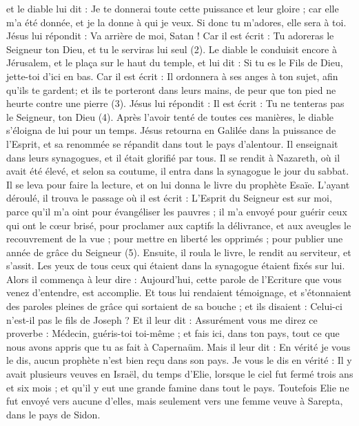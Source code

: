 \begin{multicols}{2}
et le diable lui dit : Je te donnerai toute cette puissance et leur gloire ; car elle m'a été donnée, et je la donne à qui je veux.
Si donc tu m’adores, elle sera à toi.
Jésus lui répondit : Va arrière de moi, Satan ! Car il est écrit : Tu adoreras le Seigneur ton Dieu, et tu le serviras lui seul (2).
Le diable le conduisit encore à Jérusalem, et le plaça sur le haut du temple, et lui dit : Si tu es le Fils de Dieu, jette-toi d'ici en bas.
Car il est écrit : Il ordonnera à ses anges à ton sujet, afin qu’ils te gardent;
et ils te porteront dans leurs mains, de peur que ton pied ne heurte contre une pierre (3).
Jésus lui répondit : Il est écrit : Tu ne tenteras pas le Seigneur, ton Dieu (4).
Après l’avoir tenté de toutes ces manières, le diable s’éloigna de lui pour un temps.
Jésus retourna en Galilée dans la puissance de l'Esprit, et sa renommée se répandit dans tout le pays d'alentour.
Il enseignait dans leurs synagogues, et il était glorifié par tous.
Il se rendit à Nazareth, où il avait été élevé, et selon sa coutume, il entra dans la synagogue le jour du sabbat. Il se leva pour faire la lecture,
et on lui donna le livre du prophète Esaïe. L’ayant déroulé, il trouva le passage où il est écrit :
L'Esprit du Seigneur est sur moi, parce qu'il m'a oint pour évangéliser les pauvres ; il m’a envoyé pour guérir ceux qui ont le cœur brisé,
pour proclamer aux captifs la délivrance, et aux aveugles le recouvrement de la vue ; pour mettre en liberté les opprimés ; pour publier une année de grâce du Seigneur (5).
Ensuite, il roula le livre, le rendit au serviteur, et s'assit. Les yeux de tous ceux qui étaient dans la synagogue étaient fixés sur lui.
Alors il commença à leur dire : Aujourd'hui, cette parole de l’Ecriture que vous venez d’entendre, est accomplie.
Et tous lui rendaient témoignage, et s'étonnaient des paroles pleines de grâce qui sortaient de sa bouche ; et ils disaient : Celui-ci n'est-il pas le fils de Joseph ?
Et il leur dit : Assurément vous me direz ce proverbe : Médecin, guéris-toi toi-même ; et fais ici, dans ton pays, tout ce que nous avons appris que tu as fait à Capernaüm.
Mais il leur dit : En vérité je vous le dis, aucun prophète n'est bien reçu dans son pays.
Je vous le dis en vérité : Il y avait plusieurs veuves en Israël, du temps d'Elie, lorsque le ciel fut fermé trois ans et six mois ; et qu'il y eut une grande famine dans tout le pays.
Toutefois Elie ne fut envoyé vers aucune d'elles, mais seulement vers une femme veuve à Sarepta, dans le pays de Sidon.

\end{multicols}
